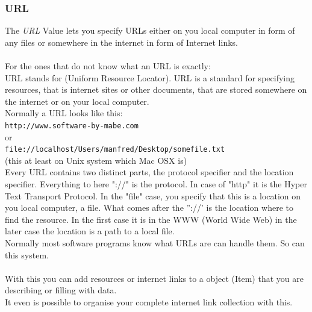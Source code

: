 \documentclass[12pt,a4]{article}
\begin{document}
\subsubsection{URL}
\label{url_datatype}
\medskip
The \textit{URL} Value lets you specify URLs either on you local computer in form of any files or somewhere in the internet in form of Internet links. \\
\\
For the ones that do not know what an URL is exactly: \\
URL stands for (Uniform Resource Locator). URL is a standard for specifying resources, that is internet sites or other documents, that are stored somewhere on the internet or on your local computer. \\
Normally a URL looks like this: \\
\nolinkurl{http://www.software-by-mabe.com} \\ 
or \\ 
\nolinkurl{file://localhost/Users/manfred/Desktop/somefile.txt}  \\
(this at least on Unix system which Mac OSX is) \\
Every URL contains two distinct parts, the protocol specifier and the location specifier. Everything to here "://" is the protocol. In case of "http" it is the Hyper Text Transport Protocol. In the "file" case, you specify that this is a location on you local computer, a file. What comes after the ''://' is the location where to find the resource. In the first case it is in the WWW (World Wide Web) in the later case the location is a path to a local file. \\
Normally most software programs know what URLs are can handle them. So can this system. \\
\\
With this you can add resources or internet links to a object (Item) that you are describing or filling with data. \\
It even is possible to organise your complete internet link collection with this.
\end{document}
